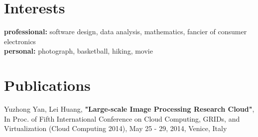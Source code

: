 \documentclass[]{friggeri-cv} %
\begin{document}


\section{Interests}

\textbf{professional:} software design, data analysis, mathematics, fancier of consumer electronics 
\\\textbf{personal:} photograph, basketball, hiking, movie


\section{Publications}


Yuzhong Yan, Lei Huang, \textbf{"Large-scale Image Processing Research Cloud"}, In Proc. of Fifth International Conference on Cloud Computing, GRIDs, and Virtualization (Cloud Computing 2014), May 25 - 29, 2014, Venice, Italy


\begin{refsection} %
\nocite{*}
\printbibliography[sorting=chronological, type=inproceedings, title={international peer-reviewed conferences/proceedings}, notkeyword={france}, heading=subbibliography]
\end{refsection}
\end{document}
